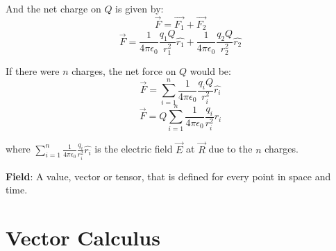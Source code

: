 \documentclass{article}
\begin{document}
And the net charge on $Q$ is given by:
$$\vec{F} = \vec{F_1} + \vec{F_2}$$
$$\vec{F} = \frac{1}{4\pi\epsilon_0} \frac{q_1Q}{r_1^2} \hat{r_1} + \frac{1}{4\pi\epsilon_0} \frac{q_2Q}{r_2^2} \hat{r_2}$$

If there were $n$ charges, the net force on $Q$ would be:
$$\vec{F} = \sum_{i=1}^n \frac{1}{4\pi\epsilon_0} \frac{q_iQ}{r_i^2} \hat{r_i}$$
$$\vec{F} = Q \sum_{i=1}^n \frac{1}{4\pi\epsilon_0} \frac{q_i}{r_i^2} \hat{r_i}$$

where $\sum_{i=1}^n \frac{1}{4\pi\epsilon_0} \frac{q_i}{r_i^2} \hat{r_i}$ is the electric field $\vec{E}$ at $\vec{R}$ due to the $n$ charges.

\textbf{Field}: A value, vector or tensor, that is defined for every point in space and time.\\[1pt] 

\section{Vector Calculus}
\end{document}
